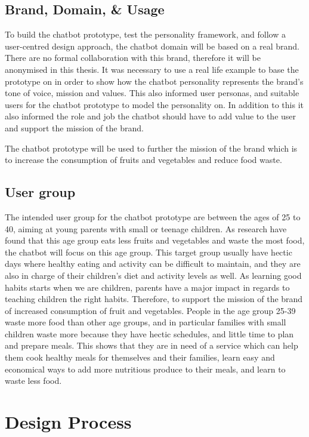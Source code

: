 \subsection{Brand, Domain, \& Usage}

To build the chatbot prototype, test the personality framework, and follow a user-centred design approach, the chatbot domain will be based on a real brand. There are no formal collaboration with this brand, therefore it will be anonymised in this thesis. It was necessary to use a real life example to base the prototype on in order to show how the chatbot personality represents the brand's tone of voice, mission and values. This also informed user personas, and suitable users for the chatbot prototype to model the personality on. In addition to this it also informed the role and job the chatbot should have to add value to the user and support the mission of the brand.

The chatbot prototype will be used to further the mission of the brand which is to increase the consumption of fruits and vegetables and reduce food waste. 


\subsection{User group}

The intended user group for the chatbot prototype are between the ages of 25 to 40, aiming at young parents with small or teenage children. As research have found that this age group eats less fruits and vegetables and waste the most food, the chatbot will focus on this age group. This target group usually have hectic days where healthy eating and activity can be difficult to maintain, and they are also in charge of their children’s diet and activity levels as well. As learning good habits starts when we are children, parents have a major impact in regards to teaching children the right habits. Therefore, to support the mission of the brand of increased consumption of fruit and vegetables. People in the age group 25-39 waste more food than other age groups, and in particular families with small children waste more because they have hectic schedules, and little time to plan and prepare meals. This shows that they are in need of a service which can help them cook healthy meals for themselves and their families, learn easy and economical ways to add more nutritious produce to their meals, and learn to waste less food.


\section{Design Process}

